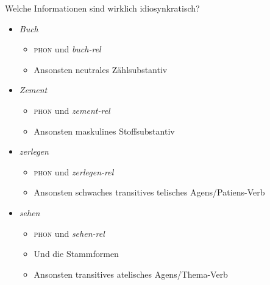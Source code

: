 \begin{frame}
  {Welche Informationen sind wirklich idiosynkratisch?}
  \onslide<+->
  \begin{itemize}[<+->]
    \item \alert{\textit{Buch}}
      \begin{itemize}[<+->]
        \item \textsc{phon} und \textit{buch-rel}
        \item Ansonsten \alert{neutrales Zählsubstantiv}
      \end{itemize}
      \Halbzeile
    \item \alert{\textit{Zement}}
      \begin{itemize}[<+->]
        \item \textsc{phon} und \textit{zement-rel}
        \item Ansonsten \alert{maskulines Stoffsubstantiv}
      \end{itemize}
      \Halbzeile
    \item \alert{\textit{zerlegen}}
      \begin{itemize}[<+->]
        \item \textsc{phon} und \textit{zerlegen-rel}
        \item Ansonsten \alert{schwaches transitives telisches Agens\slash Patiens-Verb}
      \end{itemize}
      \Halbzeile
    \item \alert{\textit{sehen}}
      \begin{itemize}[<+->]
        \item \textsc{phon} und \textit{sehen-rel}
        \item Und die \alert{Stammformen}
        \item Ansonsten \alert{transitives atelisches Agens\slash Thema-Verb}
      \end{itemize}
  \end{itemize}
\end{frame}

